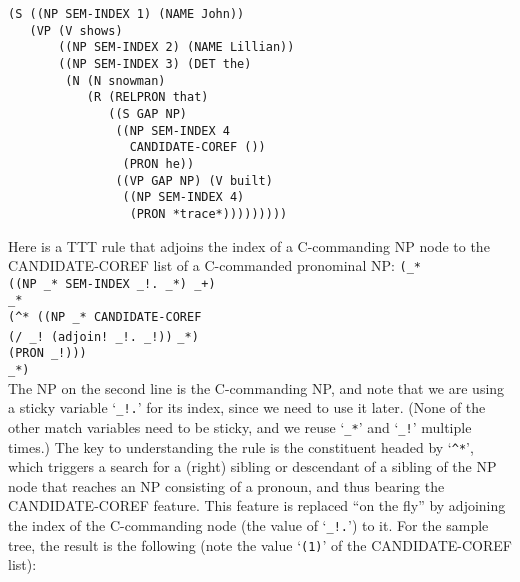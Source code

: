 \documentclass[a4,11pt]{article}
\begin{document}
\scriptsize
\begin{verbatim}
(S ((NP SEM-INDEX 1) (NAME John))
   (VP (V shows) 
       ((NP SEM-INDEX 2) (NAME Lillian))
       ((NP SEM-INDEX 3) (DET the)
        (N (N snowman)
           (R (RELPRON that)
              ((S GAP NP)
               ((NP SEM-INDEX 4 
                 CANDIDATE-COREF ())
                (PRON he))
               ((VP GAP NP) (V built)
                ((NP SEM-INDEX 4) 
                 (PRON *trace*)))))))))
\end{verbatim}
\normalsize 
Here is a TTT rule that adjoins the index of a C-commanding NP node
to the CANDIDATE-COREF list of a C-commanded pronominal NP:
% 
\scriptsize
\hspace*{2em}\texttt{(\_*}\\
\hspace*{2.5em}\texttt{((NP \_* SEM-INDEX \_!. \_*) \_+)}\\
\hspace*{2.5em}\texttt{\_*}\\
\hspace*{2.5em}\texttt{(\^{}* ((NP \_* CANDIDATE-COREF}\\
\hspace*{9.5em}\texttt{(/ \_! (adjoin! \_!. \_!))}
\hspace*{9.5em}\texttt{\_*)}\\
\hspace*{5.5em}\texttt{(PRON \_!)))}\\
\hspace*{2.5em}\texttt{\_*)}\\

\normalsize
The NP on the second line is the C-commanding NP, and note that we are
using a sticky variable `\texttt{\_!.}' for its index, since we need to use it
later. (None of the other match variables need to be sticky, and we reuse 
`\texttt{\_*}' and `\texttt{\_!}' multiple times.) The key to understanding 
the rule is the constituent headed by `\texttt{\^{}*}', which triggers a 
search for a (right) sibling or descendant of a sibling of the NP node that
reaches an NP consisting of a pronoun, and thus bearing the CANDIDATE-COREF
feature. This feature is replaced ``on the fly'' by adjoining the index
of the C-commanding node (the value of `\texttt{\_!.}') to it. For the 
sample tree, the result is the following (note the value `\texttt{(1)}' of 
the CANDIDATE-COREF list):
\end{document}
